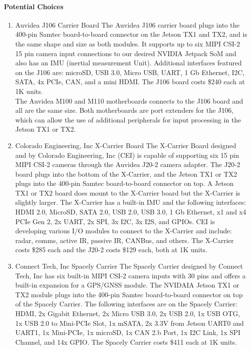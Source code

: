 \paragraph{Potential Choices}
	\begin{enumerate}
		\item{Auvidea J106 Carrier Board}
			The Auvidea J106 carrier board plugs into the 400-pin Samtec board-to-board connector 
			on the Jetson TX1 and TX2, and is the same shape and size as both modules. 
			It supports up to six MIPI CSI-2 15 pin camera input connections to our 
			desired NVIDIA Jetpack SoM and also has an IMU (inertial measurement Unit). Additional 
			interfaces featured on the J106 are: microSD, USB 
			3.0, Micro USB, UART, 1 Gb Ethernet, I2C, SATA, 4x PCIe, CAN, and a mini 
			HDMI\cite{AuvideaJ106}. The J106 board costs \$240 each at 1K units\cite{AuvideaQuote}.\\

			The Auvidea M100 and M110 motherboards connects to the J106 board and all are the same 
			size. Both motherboards are port extenders for the J106, which can allow the use of 
			additional peripherals for input processing in the Jetson TX1 or 
			TX2\cite{AuvideaMBoards}. \\

		\item{Colorado Engineering, Inc X-Carrier Board}
			The X-Carrier Board designed and by Colorado Engineering, Inc (CEI) is capable of 
			supporting six 15 pin MIPI CSI-2 cameras through the Auvidea J20-2 camera adapter. The 
			J20-2 board plugs into the bottom of the X-Carrier, and the Jetson TX1 or TX2 plugs 
			into the 400-pin Samtec board-to-board connector on top. A Jetson TX1 or TX2 board does 
			mount to the X-Carrier board but the X-Carrier is slightly larger. The X-Carrier has a built-in IMU 
			and the following interfaces: HDMI 2.0, MicroSD, SATA 2.0, USB 2.0, USB 3.0, 1 Gb 
			Ethernet, x1 and x4 PCIe Gen 2, 2x UART, 2x SPI, 3x I2C, 3x I2S, and GPIOs. CEI is  
			developing various I/O modules to connect to the X-Carrier and include: radar, comms, 
			active IR, passive IR, CANBus, and others\cite{CEIXpdf, J20TechRef, AuvideaJ20}. The X-Carrier costs \$285 each 
			and the J20-2 costs \$129 each, both at 1K units\cite{SpacelyQuote, AuvideaQuote}. \\
	
		\item{Connect Tech, Inc Spacely Carrier}
			The Spacely Carrier designed by Connect Tech, Inc has six built-in MIPI CSI-2 camera 
			inputs with 30 pins and offers a built-in expansion for a GPS/GNSS module. The NVIDAIA 
			Jetson TX1 or TX2 module plugs into the 400-pin Samtec board-to-board connector on top 
			of the Spacely Carrier. The following interfaces are on the Spacely Carrier: HDMI, 2x 
			Gigabit Ethernet, 2x Micro USB 3.0, 2x USB 2.0, 1x USB OTG, 1x USB 2.0 to Mini-PCIe 
			Slot, 1x mSATA, 2x 3.3V from Jetson UART0 and UART1, 1x Mini-PCIe, 1x microSD, 1x CAN 2.b 
			Port, 1x I2C Link, 1x SPI Channel, and 14x GPIO\cite{SpacelyUG}. The Spacely Carrier 
			costs \$411 each at 1K units.\\
	\end{enumerate}

